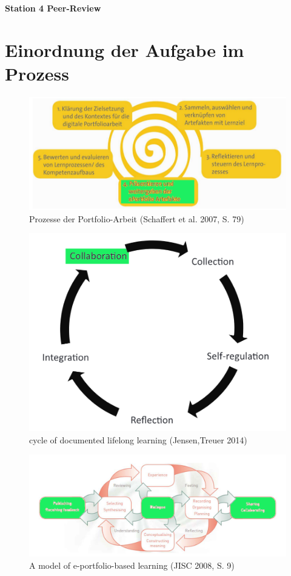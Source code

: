 \documentclass[a4paper,oneside]{scrarticle}
\begin{document}
	\pagestyle{fancy}
	\fancyhead{} %
	\fancyfoot{} %
	\begin{center}
		\begin{LARGE}
			\textbf{Station 4 Peer-Review}
		\end{LARGE}
	\end{center}
	
	\section*{Einordnung der Aufgabe im Prozess}
	\begin{figure} [h]
		\centering
		\includegraphics[width=0.7\linewidth]{e-portfolio-prozesse-schaffert}
		\caption{Prozesse der Portfolio-Arbeit (Schaffert et al. 2007, S. 79)\cite{schaffert_e-portfolio-einsatz_2007}}
		\label{fig:e-portfolio-prozesse-schaffert}
	\end{figure}
	\begin{figure}[h]
		\centering
		\includegraphics[width=0.5\linewidth]{cycle-of-documented-lifelong-learning-Jensen}
		\caption{cycle of documented lifelong learning (Jensen,Treuer 2014)\cite{jenson_defining_2014}}
		\label{fig:cycle-of-documented-lifelong-learning-jensen}
	\end{figure}
	\begin{figure}[h]
		\centering
		\includegraphics[width=0.8\linewidth]{model-of-e-portfolio-based-learning}
		\caption{A model of e-portfolio-based learning (JISC 2008, S. 9) \cite{jisc_effective_2008}}
		\label{fig:model-of-e-portfolio-based-learning}
	\end{figure}
	
\end{document}

